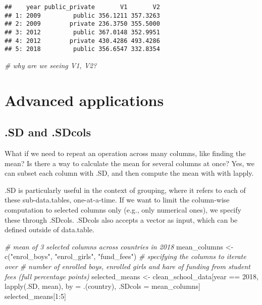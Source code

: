 \documentclass[
]{article}
\newenvironment{Shaded}{\begin{snugshade}}{\end{snugshade}}
\newcommand{\CommentTok}[1]{\textcolor[rgb]{0.56,0.35,0.01}{\textit{#1}}}
\newcommand{\DecValTok}[1]{\textcolor[rgb]{0.00,0.00,0.81}{#1}}
\newcommand{\FunctionTok}[1]{\textcolor[rgb]{0.00,0.00,0.00}{#1}}
\newcommand{\NormalTok}[1]{#1}
\newcommand{\OtherTok}[1]{\textcolor[rgb]{0.56,0.35,0.01}{#1}}
\newcommand{\SpecialCharTok}[1]{\textcolor[rgb]{0.00,0.00,0.00}{#1}}
\newcommand{\StringTok}[1]{\textcolor[rgb]{0.31,0.60,0.02}{#1}}
\begin{document}
\begin{verbatim}
##    year public_private       V1       V2
## 1: 2009         public 356.1211 357.3263
## 2: 2009        private 236.3750 355.5000
## 3: 2012         public 367.0148 352.9951
## 4: 2012        private 430.4286 493.4286
## 5: 2018         public 356.6547 332.8354
\end{verbatim}

\begin{Shaded}
\begin{Highlighting}[]
\CommentTok{\# why are we seeing V1, V2?}
\end{Highlighting}
\end{Shaded}

\hypertarget{advanced-applications}{%
\section{Advanced applications}\label{advanced-applications}}

\hypertarget{sd-and-.sdcols}{%
\subsection{.SD and .SDcols}\label{sd-and-.sdcols}}

What if we need to repeat an operation across many columns, like finding
the mean? Is there a way to calculate the mean for several columns at
once? Yes, we can subset each column with .SD, and then compute the mean
with with lapply.

.SD is particularly useful in the context of grouping, where it refers
to each of these sub-data.tables, one-at-a-time. If we want to limit the
column-wise computation to selected columns only (e.g., only numerical
ones), we specify these through .SDcols. .SDcols also accepts a vector
as input, which can be defined outside of data.table.

\begin{Shaded}
\begin{Highlighting}[]
\CommentTok{\# mean of 3 selected columns across countries in 2018}
\NormalTok{mean\_columns }\OtherTok{\textless{}{-}} \FunctionTok{c}\NormalTok{(}\StringTok{"enrol\_boys"}\NormalTok{, }\StringTok{"enrol\_girls"}\NormalTok{, }\StringTok{"fund\_fees"}\NormalTok{) }\CommentTok{\# specifying the columns to iterate over}
\CommentTok{\# number of enrolled boys, enrolled girls and hare of funding from student fees (full percentage points)}
\NormalTok{selected\_means }\OtherTok{\textless{}{-}}\NormalTok{ clean\_school\_data[year }\SpecialCharTok{==} \DecValTok{2018}\NormalTok{,        }
        \FunctionTok{lapply}\NormalTok{(.SD, mean),                    }
\NormalTok{        by }\OtherTok{=}\NormalTok{ .(country),           }
\NormalTok{        .SDcols }\OtherTok{=}\NormalTok{ mean\_columns]   }
\NormalTok{selected\_means[}\DecValTok{1}\SpecialCharTok{:}\DecValTok{5}\NormalTok{]}
\end{Highlighting}
\end{Shaded}
\end{document}
